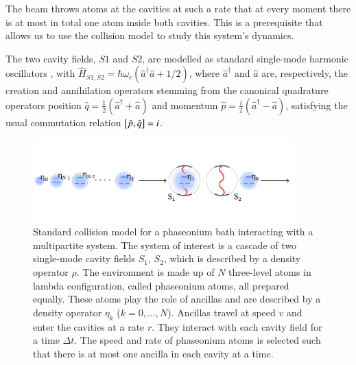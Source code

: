 \documentclass[]{article}
\renewcommand{\a}{\hat{a}}
\newcommand{\ad}{\hat{a}^\dagger}
\begin{document}
The beam throws atoms at the cavities at such a rate that at every moment there is at most in total one atom inside both cavities.  
This is a prerequisite that allows us to use the collision model to study this system's dynamics.

The two cavity fields, $S1$ and $S2$, are modelled as standard single-mode harmonic oscillators \cite{breuer_theory_2002}, with $\hat{H}_{S1,S2}=\hbar\omega_c\left(\ad\a+1/2\right)$, where $\ad$ and $\a$ are, respectively, the creation and annihilation operators stemming from the canonical quadrature operators position $\hat q=\frac{1}{2}(\ad+\a)$ and momentum $\hat p=\frac{i}{2}(\ad-\a)$, satisfying the usual commutation relation $\comm{\hat p}{\hat q} = i$.

\begin{figure}
\includegraphics[width=0.9\textwidth]{images/phaseonium_horizontal.pdf}
\caption{ Standard collision model for a phaseonium bath interacting with a multipartite system. The system of interest is a cascade of two single-mode cavity fields $S_1$, $S_2$, which is described by a density operator $\rho$. The environment is made up of $N$ three-level atoms in lambda configuration, called phaseonium atoms, all prepared equally. These atoms play the role of ancillas and are described by a density operator $\eta_k$ ($k=0,\ldots, N$). Ancillas travel at speed $v$ and enter the cavities at a rate $r$. They interact with each cavity field for a time $\Delta t$. The speed and rate of phaseonium atoms is selected such that there is at most one ancilla in each cavity at a time.}
\label{fig:cascade-setup}
\end{figure}
\end{document}
